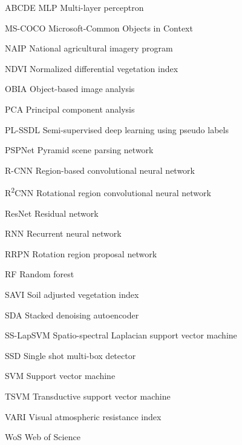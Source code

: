 \begin{seznamzkratek}{ABCDE}
	      {MLP}
	      {Multi-layer perceptron}

	      {MS-COCO}
	      {Microsoft-Common Objects in Context}

	      {NAIP}
	      {National agricultural imagery program}

	      {NDVI}
	      {Normalized differential vegetation index}

	      {OBIA}
	      {Object-based image analysis}

	      {PCA}
	      {Principal component analysis}

	      {PL-SSDL}
	      {Semi-supervised deep learning using pseudo labels}

	      {PSPNet}
	      {Pyramid scene parsing network}

	      {R-CNN}
	      {Region-based convolutional neural network}

	      {R\textsuperscript{2}CNN}
	      {Rotational region convolutional neural network}

	      {ResNet}
	      {Residual network}

	      {RNN}
	      {Recurrent neural network}

	      {RRPN}
	      {Rotation region proposal network}

	      {RF}
	      {Random forest}

	      {SAVI}
	      {Soil adjusted vegetation index}

	      {SDA}
	      {Stacked denoising autoencoder}

	      {SS-LapSVM}
	      {Spatio-spectral Laplacian support vector machine}

	      {SSD}
	      {Single shot multi-box detector}

	      {SVM}
	      {Support vector machine}

	      {TSVM}
	      {Transductive support vector machine}

	      {VARI}
	      {Visual atmospheric resistance index}

	      {WoS}
	      {Web of Science}
	      
\end{seznamzkratek}